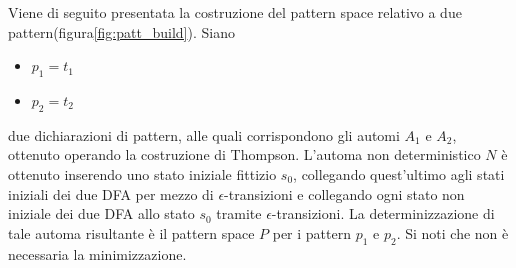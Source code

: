 \begin{ex}
Viene di seguito presentata la costruzione del pattern space relativo a due pattern(figura\ref{fig:patt_build}).
Siano
\begin{itemize}
\item $p_1 = t_1$
\item $p_2 = t_2$
\end{itemize}
due dichiarazioni di pattern, alle quali corrispondono gli automi $A_1$ e $A_2$, ottenuto operando la costruzione di Thompson. L'automa non deterministico $N$ è ottenuto inserendo uno stato iniziale fittizio $s_0$, collegando quest'ultimo agli stati iniziali dei due DFA per mezzo di $\epsilon$-transizioni e collegando ogni stato non iniziale dei due DFA allo stato $s_0$ tramite $\epsilon$-transizioni. La determinizzazione di tale automa risultante è il pattern space $P$ per i pattern $p_1$ e $p_2$. Si noti che non è necessaria la minimizzazione.
\end{ex}

